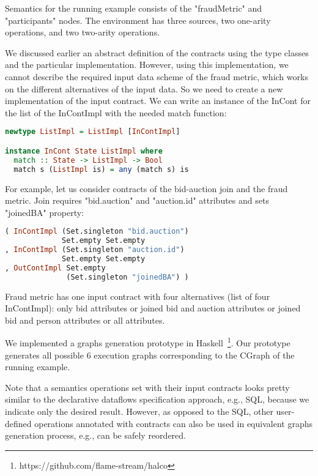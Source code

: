 Semantics for the running example consists of the "fraudMetric" and "participants" nodes.
The environment has three sources, two one-arity operations, and two two-arity operations.

We discussed earlier an abstract definition of the contracts using the type classes and the particular implementation. 
However, using this implementation, we cannot describe the required input data scheme of the fraud metric, which works on the different alternatives of the input data.
So we need to create a new implementation of the input contract.
We can write an instance of the InCont for the list of the InContImpl with the needed match function:

\begin{lstlisting}[language=Haskell]
newtype ListImpl = ListImpl [InContImpl]

instance InCont State ListImpl where
  match :: State -> ListImpl -> Bool
  match s (ListImpl is) = any (match s) is
\end{lstlisting}

For example, let us consider contracts of the bid-auction join and the fraud metric.
Join requires "bid.auction" and "auction.id" attributes and sets "joinedBA" property:
\begin{lstlisting}[language=Haskell]
( InContImpl (Set.singleton "bid.auction")
             Set.empty Set.empty
, InContImpl (Set.singleton "auction.id")
             Set.empty Set.empty
, OutContImpl Set.empty
              (Set.singleton "joinedBA") )
\end{lstlisting}

Fraud metric has one input contract with four alternatives (list of four InContImpl):
only bid attributes
or joined bid and auction attributes
or joined bid and person attributes
or all attributes.

We implemented a graphs generation prototype in Haskell~\footnote{https://github.com/flame-stream/halco}.
Our prototype generates all possible 6 execution graphs corresponding to the CGraph of the running example.

Note that a semantics operations set with their input contracts looks pretty similar to the declarative dataflows specification approach, e.g., SQL, because we indicate only the desired result.
However, as opposed to the SQL, other user-defined operations annotated with contracts can also be used in equivalent graphs generation process, e.g., can be safely reordered.
